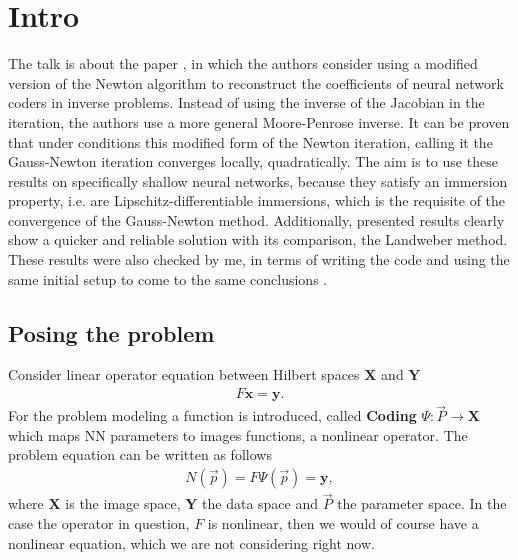 




\maketitle

\tableofcontents

\section{Intro}
The talk is about the paper \cite{scherzer2023newton}, in which the authors
consider using a modified version of the Newton algorithm to reconstruct the
coefficients of neural network coders in inverse problems. Instead of using
the inverse of the Jacobian in the iteration, the authors use a more general
Moore-Penrose inverse. It can be proven that under conditions this modified
form of the Newton iteration, calling it the Gauss-Newton iteration converges
locally, quadratically. The aim is to use these results on specifically
shallow neural networks, because they satisfy an immersion property, i.e. are
Lipschitz-differentiable immersions, which is the requisite of the
convergence of the Gauss-Newton method. Additionally, presented results clearly show a
quicker and reliable solution with its comparison, the Landweber method.
These results were also checked by me, in terms of writing the code and using
the same initial setup to come to the same conclusions \cite{code}.

\subsection{Posing the problem}
Consider linear operator equation between Hilbert spaces $\mathbf{X}$ and
$\mathbf{Y}$
\begin{align}
    F\mathbf{x} = \mathbf{y}.
\end{align}
For the problem modeling a function is introduced, called \textbf{Coding}
$\Psi: \vec{P} \to \mathbf{X}$ which maps NN parameters to images functions,
a nonlinear operator. The problem equation can be written as follows
\begin{align}
    N(\vec{p}) = F\Psi(\vec{p}) = \mathbf{y}, \label{eq: main}
\end{align}
where $\mathbf{X}$ is the image space, $\mathbf{Y}$ the data space and $\vec{P}$ the parameter
space. In the case the operator in question, $F$ is nonlinear, then we would of
course have a nonlinear equation, which we are not considering right now.

